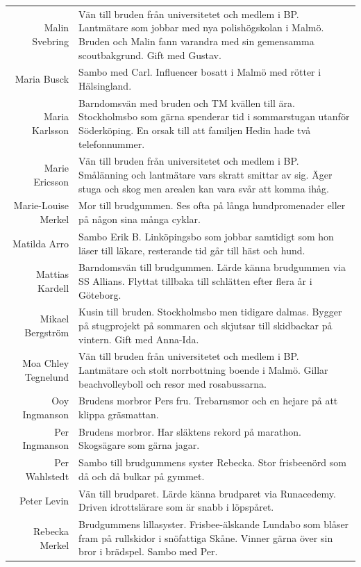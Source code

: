\documentclass[a5paper]{article}
\begin{document}
\begin{longtable}[l]{N|L}
				Malin Svebring	&	Vän till bruden från universitetet och medlem i BP. Lantmätare som jobbar med nya polishögskolan i Malmö. Bruden och Malin fann varandra med sin gemensamma scoutbakgrund. Gift med Gustav.	\\
				Maria Busck	&	Sambo med Carl. Influencer bosatt i Malmö med rötter i Hälsingland. 	\\
				Maria Karlsson	&	Barndomsvän med bruden och TM kvällen till ära. Stockholmsbo som gärna spenderar tid i sommarstugan utanför Söderköping. En orsak till att familjen Hedin hade två telefonnummer.	\\
				Marie Ericsson	&	Vän till bruden från universitetet och medlem i BP. Smålänning och lantmätare vars skratt smittar av sig. Äger stuga och skog men arealen kan vara svår att komma ihåg.	\\
				Marie-Louise Merkel	&	Mor till brudgummen. Ses ofta på långa hundpromenader eller på någon sina många cyklar.  	\\
				Matilda Arro	&	Sambo Erik B. Linköpingsbo som jobbar samtidigt som hon läser till läkare, resterande tid går till häst och hund. 	\\
				Mattias Kardell	&	Barndomsvän till brudgummen. Lärde känna brudgummen via SS Allians. Flyttat tillbaka till schlätten efter flera år i Göteborg.	\\
				Mikael Bergström	&	Kusin till bruden. Stockholmsbo men tidigare dalmas. Bygger på stugprojekt på sommaren och skjutsar till skidbackar på vintern. Gift med Anna-Ida.	\\
				Moa Chley Tegnelund	&	Vän till bruden från universitetet och medlem i BP. Lantmätare och stolt norrbottning boende i Malmö. Gillar beachvolleyboll och resor med rosabussarna.  	\\
				Ooy Ingmanson	&	Brudens morbror Pers fru. Trebarnsmor och en hejare på att klippa gräsmattan.	\\
				Per Ingmanson	&	Brudens morbror. Har släktens rekord på marathon. Skogsägare som gärna jagar. 	\\
				Per Wahlstedt	&	Sambo till brudgummens syster Rebecka. Stor frisbeenörd som då och då bulkar på gymmet. 	\\
				Peter Levin	&	Vän till brudparet. Lärde känna brudparet via Runacedemy. Driven idrottslärare som är snabb i löpspåret.	\\
				Rebecka Merkel	&	Brudgummens lillasyster. Frisbee-älskande Lundabo som blåser fram på rullskidor i snöfattiga Skåne. Vinner gärna över sin bror i brädspel. Sambo med Per. 	\\

\end{longtable}
\end{document}

